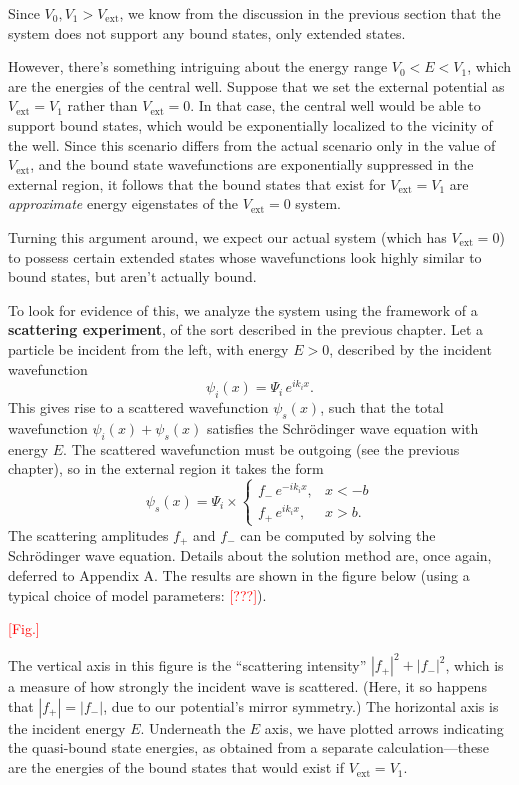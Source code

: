 \documentclass[pra,12pt]{revtex4}
\begin{document}
Since $V_0, V_1 > V_{\mathrm{ext}}$, we know from the discussion in
the previous section that the system does not support any bound
states, only extended states.

However, there's something intriguing about the energy range $V_0 < E
< V_1$, which are the energies of the central well.  Suppose that we
set the external potential as $V_{\mathrm{ext}} = V_1$ rather than
$V_{\mathrm{ext}} = 0$.  In that case, the central well would be able
to support bound states, which would be exponentially localized to the
vicinity of the well.  Since this scenario differs from the actual
scenario only in the value of $V_{\mathrm{ext}}$, and the bound state
wavefunctions are exponentially suppressed in the external region, it
follows that the bound states that exist for $V_{\mathrm{ext}} = V_1$
are \textit{approximate} energy eigenstates of the $V_{\mathrm{ext}} =
0$ system.

Turning this argument around, we expect our actual system (which has
$V_{\mathrm{ext}} = 0$) to possess certain extended states whose
wavefunctions look highly similar to bound states, but aren't actually
bound.

To look for evidence of this, we analyze the system using the
framework of a \textbf{scattering experiment}, of the sort described
in the previous chapter.  Let a particle be incident from the left,
with energy $E > 0$, described by the incident wavefunction
$$\psi_i(x) = \Psi_i \, e^{ik_i x}.$$
This gives rise to a scattered wavefunction $\psi_s(x)$, such that the
total wavefunction $\psi_i(x) + \psi_s(x)$ satisfies the Schr\"odinger
wave equation with energy $E$.  The scattered wavefunction must be
outgoing (see the previous chapter), so in the external region it
takes the form
$$\psi_s(x) = \Psi_i \times \begin{cases}f_- \,e^{-ik_ix}, & x < -b \\ f_+ \,e^{ik_ix}, & x > b.\end{cases}$$
The scattering amplitudes $f_+$ and $f_-$ can be computed by solving
the Schr\"odinger wave equation.  Details about the solution method
are, once again, deferred to Appendix A.  The results are shown in the
figure below (using a typical choice of model parameters:
\textcolor{red}{[???]}).

\textcolor{red}{[Fig.]}

The vertical axis in this figure is the ``scattering intensity''
$|f_+|^2 + |f_-|^2$, which is a measure of how strongly the incident
wave is scattered.  (Here, it so happens that $|f_+| = |f_-|$, due to
our potential's mirror symmetry.)  The horizontal axis is the incident
energy $E$.  Underneath the $E$ axis, we have plotted arrows
indicating the quasi-bound state energies, as obtained from a separate
calculation---these are the energies of the bound states that would
exist if $V_{\mathrm{ext}} = V_1$.
\end{document}

